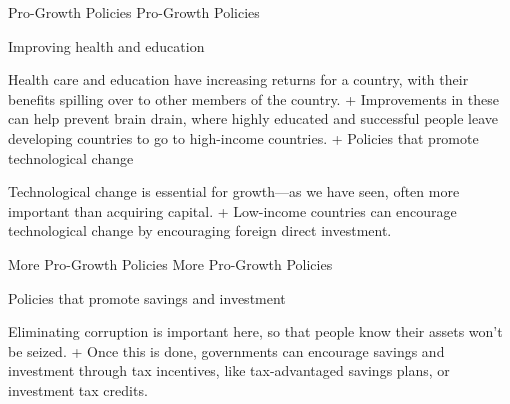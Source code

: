 \documentclass[
  12pt,
  ignorenonframetext,
]{beamer}
\begin{document}
\begin{frame}{Pro-Growth Policies}
\protect\hypertarget{pro-growth-policies}{}
Pro-Growth Policies

Improving health and education

Health care and education have increasing returns for a country, with
their benefits spilling over to other members of the country. +
Improvements in these can help prevent brain drain, where highly
educated and successful people leave developing countries to go to
high-income countries. + Policies that promote technological change

Technological change is essential for growth---as we have seen, often
more important than acquiring capital. + Low-income countries can
encourage technological change by encouraging foreign direct investment.
\end{frame}

\begin{frame}{More Pro-Growth Policies}
\protect\hypertarget{more-pro-growth-policies}{}
More Pro-Growth Policies

Policies that promote savings and investment

Eliminating corruption is important here, so that people know their
assets won't be seized. + Once this is done, governments can encourage
savings and investment through tax incentives, like tax-advantaged
savings plans, or investment tax credits.
\end{frame}
\end{document}
